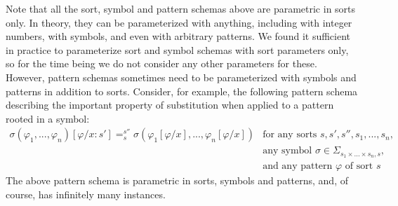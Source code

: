 \documentclass[UTF8,11pt]{article}
\theoremstyle{plain}
\theoremstyle{definition}
\theoremstyle{remark}
\begin{document}
Note that all the sort, symbol and pattern schemas above are parametric in
sorts only.
In theory, they can be parameterized with anything, including with integer
numbers, with symbols, and even with arbitrary patterns.
We found it sufficient in practice to parameterize sort and symbol schemas with
sort parameters only, so for the time being we do not consider any other
parameters for these.
However, pattern schemas sometimes need to be parameterized with symbols and
patterns in addition to sorts.
Consider, for example, the following pattern schema describing the important
property of substitution when applied to a pattern rooted in a symbol:
$$
\begin{array}{rl}
\sigma(\varphi_1,...,\varphi_n)[\varphi/x:s']
=_s^{s''}
\sigma(\varphi_1[\varphi/x],...,\varphi_n[\varphi/x])
&
\textrm{for any sorts $s, s', s'', s_1,...,s_n$,}
\\
& \textrm{any symbol $\sigma\in\Sigma_{s_1\times...\times s_n, s}$,}
\\
& \textrm{and any pattern $\varphi$ of sort $s$}
\end{array}
$$
The above pattern schema is parametric in sorts, symbols and patterns, and,
of course, has infinitely many instances.
\end{document}
